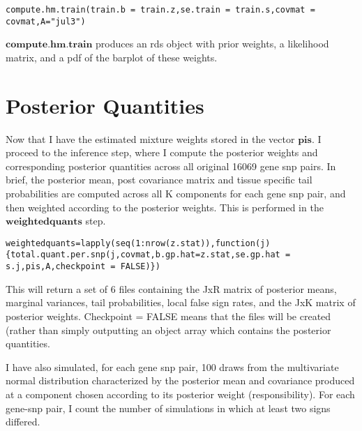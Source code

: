 \documentclass[10pt]{article}
\begin{document}
\begin{itemize}
\begin{verbatim}
compute.hm.train(train.b = train.z,se.train = train.s,covmat = covmat,A="jul3")
\end{verbatim}

$\textbf{compute.hm.train}$ produces an rds object with prior weights, a likelihood matrix, and a pdf of the barplot of these weights.

\section{Posterior Quantities}
Now that I have the estimated mixture weights stored in the vector $\textbf{pis}$. I proceed to the inference step, where I compute the posterior weights and corresponding posterior quantities across all original 16069 gene snp pairs. In brief, the posterior mean, post covariance matrix and tissue specific tail probabilities are computed across all K components for each gene snp pair, and then weighted according to the posterior weights. This is performed in the $\textbf{weightedquants}$ step.


 \begin{verbatim}
weightedquants=lapply(seq(1:nrow(z.stat)),function(j){total.quant.per.snp(j,covmat,b.gp.hat=z.stat,se.gp.hat = s.j,pis,A,checkpoint = FALSE)})
\end{verbatim}                          
%  
%
This will return a set of 6 files containing the JxR matrix of posterior means, marginal variances, tail probabilities, local false sign rates, and the JxK matrix of posterior weights. Checkpoint = FALSE means that the files will be created (rather than simply outputting an object array which contains the posterior quantities.

I have also simulated, for each gene snp pair, 100 draws from the multivariate normal distribution characterized by the posterior mean and covariance produced at a component chosen according to its posterior weight (responsibility). For each gene-snp pair, I count the number of simulations in which at least two signs differed. 


\end{itemize}
\end{document}
